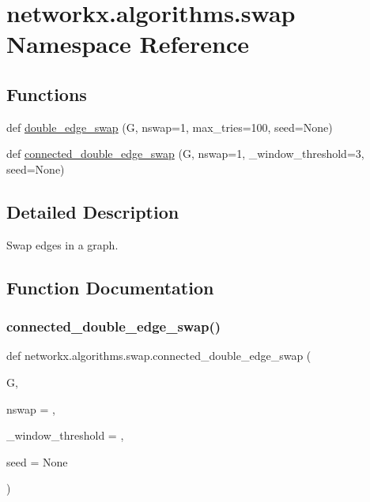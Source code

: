 \hypertarget{namespacenetworkx_1_1algorithms_1_1swap}{}\section{networkx.\+algorithms.\+swap Namespace Reference}
\label{namespacenetworkx_1_1algorithms_1_1swap}
\subsection*{Functions}
\begin{DoxyCompactItemize}
\item 
def \hyperlink{namespacenetworkx_1_1algorithms_1_1swap_a05e63bb95be054d5c3e7c4f9144b0040}{double\+\_\+edge\+\_\+swap} (G, nswap=1, max\+\_\+tries=100, seed=None)
\item 
def \hyperlink{namespacenetworkx_1_1algorithms_1_1swap_a03679ffb50a1ee776423e7184b9d596d}{connected\+\_\+double\+\_\+edge\+\_\+swap} (G, nswap=1, \+\_\+window\+\_\+threshold=3, seed=None)
\end{DoxyCompactItemize}


\subsection{Detailed Description}
\begin{DoxyVerb}Swap edges in a graph.
\end{DoxyVerb}
 

\subsection{Function Documentation}
\mbox{\label{namespacenetworkx_1_1algorithms_1_1swap_a03679ffb50a1ee776423e7184b9d596d}} 
\subsubsection{\texorpdfstring{connected\+\_\+double\+\_\+edge\+\_\+swap()}{connected\_double\_edge\_swap()}}
{\footnotesize\ttfamily def networkx.\+algorithms.\+swap.\+connected\+\_\+double\+\_\+edge\+\_\+swap (\begin{DoxyParamCaption}\item[{}]{G,  }\item[{}]{nswap = {},  }\item[{}]{\+\_\+window\+\_\+threshold = {},  }\item[{}]{seed = {\ttfamily None} }\end{DoxyParamCaption})}

